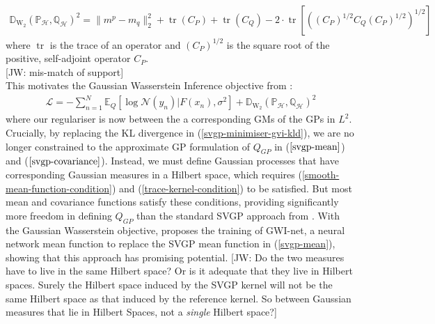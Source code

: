 \documentclass{article}
\newcommand{\jw}[1]{{\color{gray} [JW: #1]}}
\newcommand{\KLD}{\operatorname{\mathbb{D}_{KL}}}
\newcommand{\WD}{\operatorname{\mathbb{D}_{W_2}}}
\newcommand{\tr}{\operatorname{tr}}
\numberwithin{equation}{section}
\begin{document}
\begin{align}
    \label{wasserstein-distance}
    \WD \left(\mathbb{P}_{\mathcal{H}}, \mathbb{Q}_{\mathcal{H}}\right)^2 = \| m^p - m_q\|_2^2 + \tr(C_P) + \tr(C_Q) - 2 \cdot \tr \left[ \left( \left(C_P\right)^{1/2} C_Q \left(C_P\right)^{1/2}\right)^{1/2}\right]
\end{align}
where $\tr$ is the trace of an operator and $\left(C_P\right)^{1/2}$ is the square root of the positive, self-adjoint operator $C_P$.
\\\jw{mis-match of support}
\\This motivates the Gaussian Wasserstein Inference objective from \cite{wild2022generalized}:
\begin{align}
    \label{gwi-objective}
    \mathcal{L} = -\sum_{n=1}^N \mathbb{E}_{Q}\left[\log \mathcal{N}(y_n) \vert F(x_n), \sigma^2\right] + \WD \left(\mathbb{P}_{\mathcal{H}}, \mathbb{Q}_{\mathcal{H}}\right)^2
\end{align}
where our regulariser is now between the a corresponding GMs of the GPs in $L^2$.
Crucially, by replacing the KL divergence in (\ref{svgp-minimiser-gvi-kld}), we are no longer constrained to the approximate GP formulation of $Q_{GP}$ in  ($\ref{svgp-mean}$) and ($\ref{svgp-covariance}$). Instead, we must define Gaussian processes that have corresponding Gaussian measures in a Hilbert space, which requires (\ref{smooth-mean-function-condition}) and (\ref{trace-kernel-condition}) to be satisfied. But most mean and covariance functions satisfy these conditions, providing significantly more freedom in defining $Q_{GP}$ than the standard SVGP approach from \cite{titsias2009variational}. With the Gaussian Wasserstein objective, \cite{wild2022generalized} proposes the training of GWI-net, a neural network mean function to replace the SVGP mean function in (\ref{svgp-mean}), showing that this approach has promising potential.
\jw{Do the two measures have to live in the same Hilbert space? Or is it adequate that they live in Hilbert spaces. Surely the Hilbert space induced by the SVGP kernel will not be the same Hilbert space as that induced by the reference kernel. So between Gaussian measures that lie in Hilbert Spaces, not a \textit{single} Hilbert space?}
\end{document}

